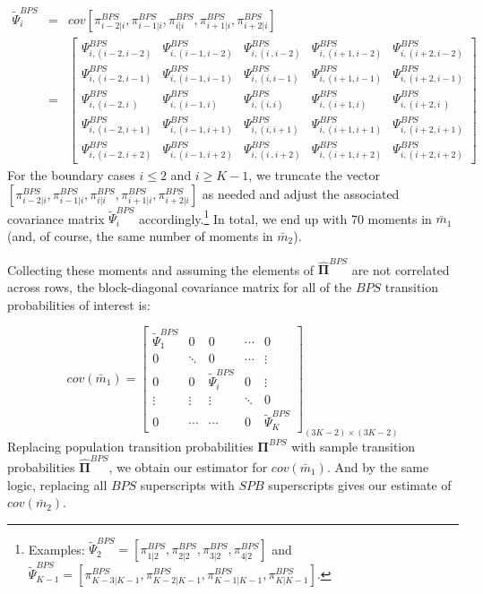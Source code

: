 \documentclass[12pt]{article} \usepackage{amsmath,amssymb,amsthm,geometry,graphicx,setspace,algorithm,algpseudocode,float}
\begin{document}
\begin{eqnarray*}
\tilde{\Psi}_{i}^{BPS} &=&cov[\pi _{i-2|i}^{BPS},\pi _{i-1|i}^{BPS},\pi
_{i|i}^{BPS},\pi _{i+1|i}^{BPS},\pi _{i+2|i}^{BPS}] \\
&=&\left[ 
\begin{array}{ccccc}
\Psi _{i,(i-2,i-2)}^{BPS} & \Psi _{i,(i-1,i-2)}^{BPS} & \Psi _{i,(i\
,i-2)}^{BPS} & \Psi _{i,(i+1,i-2)}^{BPS} & \Psi _{i,(i+2,i-2)}^{BPS} \\ 
\Psi _{i,(i-2,i-1)}^{BPS} & \Psi _{i,(i-1,i-1)}^{BPS} & \Psi
_{i,(i,i-1)}^{BPS} & \Psi _{i,(i+1,i-1)}^{BPS} & \Psi _{i,(i+2,i-1)}^{BPS}
\\ 
\Psi _{i,(i-2,i\ )}^{BPS} & \Psi _{i,(i-1,i)}^{BPS} & \Psi _{i,(i,i)}^{BPS}
& \Psi _{i,(i+1,i)}^{BPS} & \Psi _{i,(i+2,i\ )}^{BPS} \\ 
\Psi _{i,(i-2,i+1)}^{BPS} & \Psi _{i,(i-1,i+1)}^{BPS} & \Psi
_{i,(i,i+1)}^{BPS} & \Psi _{i,(i+1,i+1)}^{BPS} & \Psi _{i,(i+2,i+1)}^{BPS}
\\ 
\Psi _{i,(i-2,i+2)}^{BPS} & \Psi _{i,(i-1,i+2)}^{BPS} & \Psi _{i,(i\
,i+2)}^{BPS} & \Psi _{i,(i+1,i+2)}^{BPS} & \Psi _{i,(i+2,i+2)}^{BPS}%
\end{array}%
\right] 
\end{eqnarray*}%
For the boundary cases $i\leq 2$ and $i\geq K-1$, we truncate the vector $%
[\pi _{i-2|i}^{BPS},\pi _{i-1|i}^{BPS},\pi _{i|i}^{BPS},\pi
_{i+1|i}^{BPS},\pi _{i+2|i}^{BPS}]$ as needed and adjust the associated
covariance matrix $\tilde{\Psi}_{i}^{BPS}$ accordingly.\footnote{%
Examples: $\tilde{\Psi}_{2}^{BPS}=[\pi _{1|2}^{BPS},\pi _{2|2}^{BPS},\pi
_{3|2}^{BPS},\pi _{4|2}^{BPS}]$ and 
$\tilde{\Psi}_{K-1}^{BPS}=[\pi
_{K-3|K-1}^{BPS},\pi _{K-2|K-1}^{BPS},\pi _{K-1|K-1}^{BPS},\pi
_{K|K-1}^{BPS}].$ \medskip} In total, we end up with 70 moments in $\bar{m}_{1}$
(and, of course, the same number of moments in $\bar{m}_{2}$)$.$

Collecting these moments and assuming the elements of $\mathbf{\hat{\Pi}}%
^{BPS}$ are not correlated across rows, the block-diagonal covariance matrix
for all of the $BPS$ transition probabilities of interest is:

\begin{equation*}
cov(\bar{m}_{1})=\left[ 
\begin{array}{ccccc}
\tilde{\Psi}_{1}^{BPS} & 0 & 0 & \cdots  & 0 \\ 
0 & \ddots  & 0 & \cdots  & \vdots  \\ 
0 & 0 & \tilde{\Psi}_{i}^{BPS} & 0 & \vdots  \\ 
\vdots  & \vdots  & \vdots  & \ddots  & 0 \\ 
0 & \cdots  & \cdots  & 0 & \tilde{\Psi}_{K}^{BPS}%
\end{array}%
\right] _{\left( 3K-2\right) \times \left( 3K-2\right) }
\end{equation*}%
Replacing population transition probabilities $\mathbf{\Pi }^{BPS}$ with
sample transition probabilities $\mathbf{\hat{\Pi}}^{BPS}$, we obtain our
estimator for $cov(\bar{m}_{1}).$ And by the same logic, replacing all $BPS$ superscripts with $%
SPB$ superscripts gives our estimate of $cov(%
\bar{m}_{2})$. 
\end{document}
